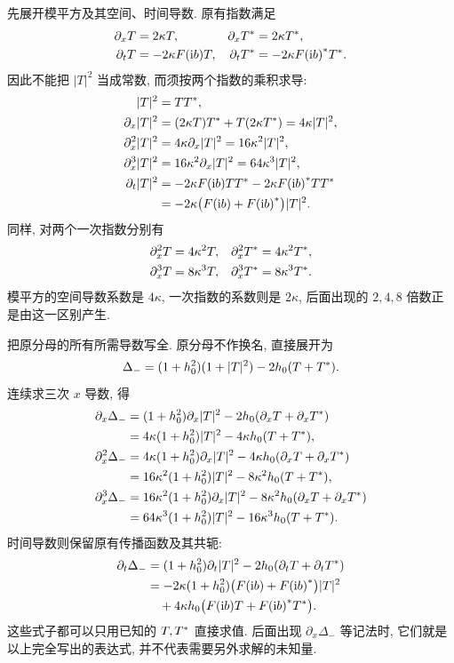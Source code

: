 \par\smallskip\noindent 先展开模平方及其空间、时间导数.\quad
原有指数满足
\begin{align*}
\partial_xT&=2\kappa T,
&\partial_x{T}^{*}&=2\kappa{T}^{*},\\
\partial_tT&=-2\kappa F(\mathrm{i} b)T,
&\partial_t{T}^{*}&=-2\kappa{F(\mathrm{i}b)}^{*}{T}^{*}.
\end{align*}
因此不能把 $|T|^2$ 当成常数, 而须按两个指数的乘积求导:
\begin{align*}
|T|^2&=T{T}^{*},\\
\partial_x|T|^2
&=(2\kappa T){T}^{*}
+T(2\kappa{T}^{*})=4\kappa|T|^2,\\
\partial_x^2|T|^2
&=4\kappa\partial_x|T|^2
=16\kappa^2|T|^2,\\
\partial_x^3|T|^2
&=16\kappa^2\partial_x|T|^2
=64\kappa^3|T|^2,\\
\partial_t|T|^2
&=-2\kappa F(\mathrm{i} b)T{T}^{*}
-2\kappa{F(\mathrm{i}b)}^{*}T{T}^{*}\\
&=-2\kappa\bigl(F(\mathrm{i} b)+{F(\mathrm{i} b)}^{*}\bigr)|T|^2.
\end{align*}
同样, 对两个一次指数分别有
\begin{align*}
\partial_x^2T&=4\kappa^2T,
&\partial_x^2{T}^{*}&=4\kappa^2{T}^{*},\\
\partial_x^3T&=8\kappa^3T,
&\partial_x^3{T}^{*}&=8\kappa^3{T}^{*}.
\end{align*}
模平方的空间导数系数是 $4\kappa$, 一次指数的系数则是 $2\kappa$, 后面出现的 $2,4,8$ 倍数正是由这一区别产生.

\par\smallskip\noindent 把原分母的所有所需导数写全.\quad
原分母不作换名, 直接展开为
\begin{equation*}
\Delta_-=(1+h_0^2)(1+|T|^2)-2h_0(T+{T}^{*}).
\end{equation*}
连续求三次 $x$ 导数, 得
\begin{align*}
\partial_x\Delta_-
&=(1+h_0^2)\partial_x|T|^2
-2h_0(\partial_xT+\partial_x{T}^{*})\\
&=4\kappa(1+h_0^2)|T|^2
-4\kappa h_0(T+{T}^{*}),\\
\partial_x^2\Delta_-
&=4\kappa(1+h_0^2)\partial_x|T|^2
-4\kappa h_0(\partial_xT+\partial_x{T}^{*})\\
&=16\kappa^2(1+h_0^2)|T|^2
-8\kappa^2h_0(T+{T}^{*}),\\
\partial_x^3\Delta_-
&=16\kappa^2(1+h_0^2)\partial_x|T|^2
-8\kappa^2h_0(\partial_xT+\partial_x{T}^{*})\\
&=64\kappa^3(1+h_0^2)|T|^2
-16\kappa^3h_0(T+{T}^{*}).
\end{align*}
时间导数则保留原有传播函数及其共轭:
\begin{align*}
\partial_t\Delta_-
&=(1+h_0^2)\partial_t|T|^2
-2h_0(\partial_tT+\partial_t{T}^{*})\\
&=-2\kappa(1+h_0^2)
\bigl(F(\mathrm{i} b)+{F(\mathrm{i} b)}^{*}\bigr)|T|^2\\
&\quad+4\kappa h_0
\bigl(F(\mathrm{i} b)T+{F(\mathrm{i} b)}^{*}{T}^{*}\bigr).
\end{align*}
这些式子都可以只用已知的 $T,{T}^{*}$ 直接求值. 后面出现 $\partial_x\Delta_-$ 等记法时, 它们就是以上完全写出的表达式, 并不代表需要另外求解的未知量.

